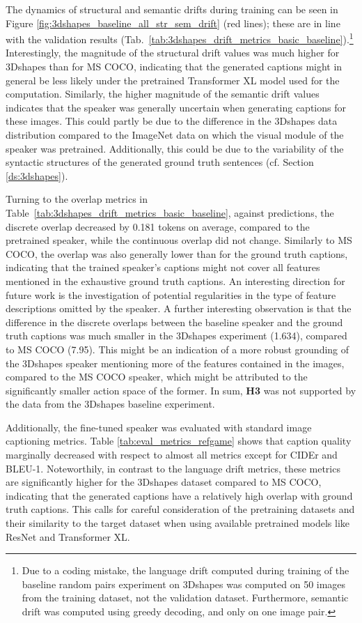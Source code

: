 The dynamics of structural and semantic drifts during training can be seen in Figure \ref{fig:3dshapes_baseline_all_str_sem_drift} (red lines); these are in line with the validation results (Tab.~\ref{tab:3dshapes_drift_metrics_basic_baseline}).\footnote{Due to a coding mistake, the language drift computed during training of the baseline random pairs experiment on 3Dshapes was computed on 50 images from the training dataset, not the validation dataset. Furthermore, semantic drift was computed using greedy decoding, and only on one image pair.} 
Interestingly, the magnitude of the structural drift values was much higher for 3Dshapes than for MS COCO, indicating that the generated captions might in general be less likely under the pretrained Transformer XL model used for the computation. Similarly, the higher magnitude of the semantic drift values indicates that the speaker was generally uncertain when generating captions for these images. This could partly be due to the difference in the 3Dshapes data distribution compared to the ImageNet data on which the visual module of the speaker was pretrained. Additionally, this could be due to the variability of the syntactic structures of the generated ground truth sentences (cf. Section \ref{ds:3dshapes}). 

Turning to the overlap metrics in Table~\ref{tab:3dshapes_drift_metrics_basic_baseline}, against predictions, the discrete overlap decreased by 0.181 tokens on average, compared to the pretrained speaker, while the continuous overlap did not change. Similarly to MS COCO, the overlap was also generally lower than for the ground truth captions, indicating that the trained speaker's captions might not cover all features mentioned in the exhaustive ground truth captions. An interesting direction for future work is the investigation of potential regularities in the type of feature descriptions omitted by the speaker. A further interesting observation is that the difference in the discrete overlaps between the baseline speaker and the ground truth captions was much smaller in the 3Dshapes experiment (1.634), compared to MS COCO (7.95). This might be an indication of a more robust grounding of the 3Dshapes speaker mentioning more of the features contained in the images, compared to the MS COCO speaker, which might be attributed to the significantly smaller action space of the former. In sum, \textbf{H3} was not supported by the data from the 3Dshapes baseline experiment.

Additionally, the fine-tuned speaker was evaluated with standard image captioning metrics. Table \ref{tab:eval_metrics_refgame} shows that caption quality marginally decreased with respect to almost all metrics except for CIDEr and BLEU-1. Noteworthily, in contrast to the language drift metrics, these metrics are significantly higher for the 3Dshapes dataset compared to MS COCO, indicating that the generated captions have a relatively high overlap with ground truth captions. This calls for careful consideration of the pretraining datasets and their similarity to the target dataset when using available pretrained models like ResNet and Transformer XL.

